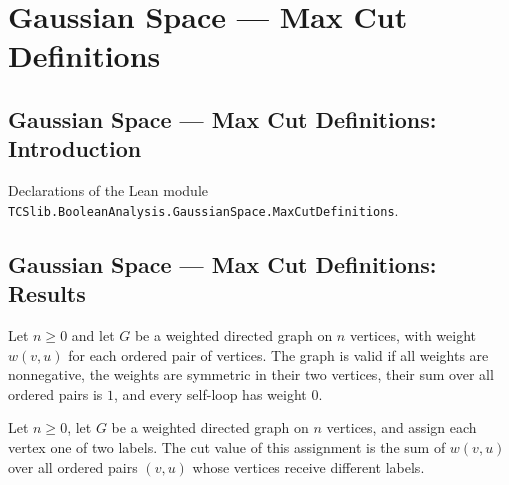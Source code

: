 \section{Gaussian Space --- Max Cut Definitions}
\subsection*{Gaussian Space --- Max Cut Definitions: Introduction}

Declarations of the Lean module \texttt{TCSlib.BooleanAnalysis.GaussianSpace.MaxCutDefinitions}.

\subsection*{Gaussian Space --- Max Cut Definitions: Results}

\begin{definition}
\label{BooleanAnalysis.GaussianSpace.MaxCut.IsValid}
\leanok
{}
Let $n\ge 0$ and let $G$ be a weighted directed graph on $n$ vertices, with weight
$w(v,u)$ for each ordered pair of vertices. The graph is valid if all weights are
nonnegative, the weights are symmetric in their two vertices, their sum over all ordered
pairs is $1$, and every self-loop has weight $0$.
\end{definition}

\begin{definition}
\label{BooleanAnalysis.GaussianSpace.MaxCut.cutValue}
\leanok
{}
Let $n\ge 0$, let $G$ be a weighted directed graph on $n$ vertices, and assign each
vertex one of two labels. The cut value of this assignment is the sum of $w(v,u)$ over
all ordered pairs $(v,u)$ whose vertices receive different labels.
\end{definition}


